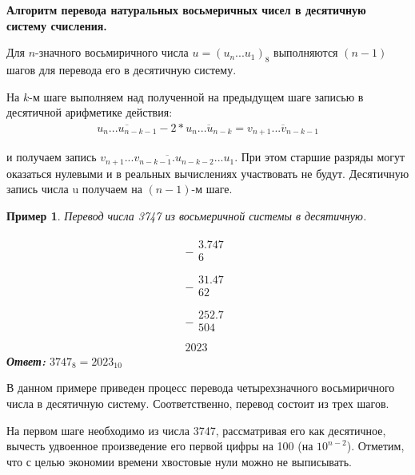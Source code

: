 \documentclass[14pt, russian]{scrartcl}
\newcounter{cExample}
\newtheorem{Example}{Пример}[cExample]
\begin{document}
\vspace{1em}
\textbf{Алгоритм перевода натуральных восьмеричных чисел в десятичную систему счисления.}

Для $n$-значного восьмиричного числа $u = (u_n...u_1)_8$ выполняются $(n - 1)$ шагов для перевода его в десятичную систему.

На $k$-м шаге выполняем над полученной на предыдущем шаге записью в десятичной арифметике действия:
\label{Example:MathFont4} 
\begin{equation*}\label{eq:4}
\begin{aligned}
\overline{u_n ... u_{n-k-1}} - 2 * \overline{u_n ... u_{n-k}} = \overline{v_{n+1} ... v_{n-k-1}}
\end{aligned}
\end{equation*} 

\noindent 
и получаем запись $\overline{v_{n+1} ... v_{n-k-1}.u_{n-k-2} ... u_1}$. При этом старшие разряды могут оказаться нулевыми и в реальных вычислениях участвовать не будут. Десятичную запись числа u получаем на $(n - 1)$-м шаге.

\begin{Example}\label{Example:MathFont5}
Перевод числа 3747 из восьмеричной системы в десятичную. 

$$
\begin{array}{r}
-
\begin{array}{r}
3.747\\
6\quad\quad\\
\end{array} \\
\hline
-
\begin{array}{r}
31.47\\
62\,\,\,\,\\
\end{array} \\
\hline
-
\begin{array}{r}
252.7\\
504\\
\end{array} \\
\hline
2023\,\,\,
\end{array}
$$
\textbf{Ответ:} $3747_8 = 2023_{10}$ 
\end{Example} 


В данном примере приведен процесс перевода четырехзначного восьмиричного числа в десятичную систему. Соответственно, перевод состоит из трех шагов.

На первом шаге необходимо из числа 3747, рассматривая его как десятичное, вычесть удвоенное произведение его первой цифры на 100 (на $10^{n-2}$). Отметим, что с целью экономии времени хвостовые нули можно не выписывать.
\end{document}
